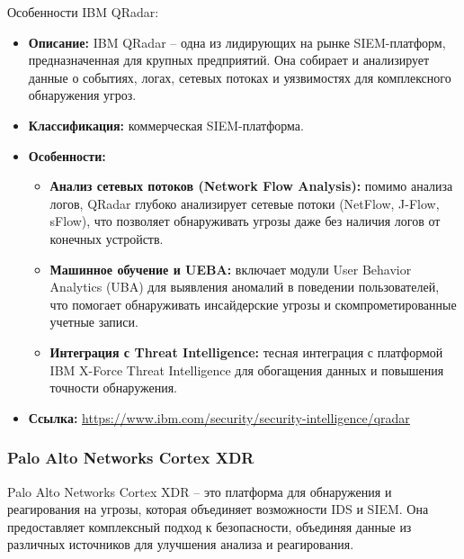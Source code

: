 Особенности IBM QRadar:
\begin{itemize}
		\item \textbf{Описание:} IBM QRadar -- одна из лидирующих на рынке SIEM-платформ, предназначенная для крупных предприятий. Она собирает и анализирует данные о событиях, логах, сетевых потоках и уязвимостях для комплексного обнаружения угроз.
    \item \textbf{Классификация:} коммерческая SIEM-платформа.
    \item \textbf{Особенности:}
    \begin{itemize}
        \item \textbf{Анализ сетевых потоков (Network Flow Analysis):} помимо анализа логов, QRadar глубоко анализирует сетевые потоки (NetFlow, J-Flow, sFlow), что позволяет обнаруживать угрозы даже без наличия логов от конечных устройств.
        \item \textbf{Машинное обучение и UEBA:} включает модули User Behavior Analytics (UBA) для выявления аномалий в поведении пользователей, что помогает обнаруживать инсайдерские угрозы и скомпрометированные учетные записи.
        \item \textbf{Интеграция с Threat Intelligence:} тесная интеграция с платформой IBM X-Force Threat Intelligence для обогащения данных и повышения точности обнаружения.
    \end{itemize}
    \item \textbf{Ссылка:} \url{https://www.ibm.com/security/security-intelligence/qradar}
\end{itemize}

\subsubsection{Palo Alto Networks Cortex XDR}

Palo Alto Networks Cortex XDR -- это платформа для обнаружения и реагирования на угрозы, которая объединяет возможности IDS и SIEM. Она предоставляет комплексный подход к безопасности, объединяя данные из различных источников для улучшения анализа и реагирования.

